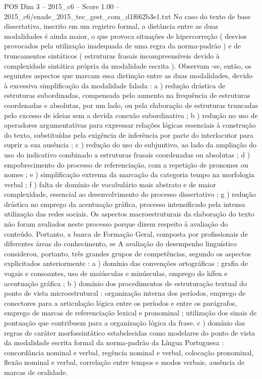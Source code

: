 \begin{textsample}{POS Dim 3 – 2015\_c6 – Score 1.00 – 2015\_c6/enade\_2015\_tec\_gest\_com\_d1f662b3e1.txt}
No caso do texto de base dissertativa, inscrito em um registro formal, a distância entre as duas modalidades é ainda maior, o que provoca situações de hipercorreção ( desvios provocados pela utilização inadequada de uma regra da norma-padrão ) e de truncamentos sintáticos ( estruturas frasais incompreensíveis devido à complexidade sintática própria da modalidade escrita ).
Observam -se, então, os seguintes aspectos que marcam essa distinção entre as duas modalidades, devido à excessiva simplificação da modalidade falada : a ) redução drástica de estruturas subordinadas, compensada pelo aumento na frequência de estruturas coordenadas e absolutas, por um lado, ou pela elaboração de estruturas truncadas pelo excesso de ideias sem a devida conexão subordinativa ; b ) redução no uso de operadores argumentativas para expressar relações lógicas essenciais à construção do texto, substituídas pela exigência de inferência por parte do interlocutor para suprir a sua ausência ; c ) redução do uso do subjuntivo, ao lado da ampliação do uso do indicativo combinado a estruturas frasais coordenadas ou absolutas ; d ) empobrecimento do processo de referenciação, com a repetição de pronomes ou nomes ; e ) simplificação extrema da marcação da categoria tempo na morfologia verbal ; f ) falta de domínio de vocabulário mais abstrato e de maior complexidade, essencial ao desenvolvimento do processo dissertativo ; g ) redução drástica no emprego da acentuação gráfica, processo intensificado pela intensa utilização das redes sociais.
Os aspectos macroestruturais da elaboração do texto não foram avaliados neste processo porque dizem respeito à avaliação do conteúdo.
Portanto, a banca de Formação Geral, composta por profissionais de diferentes áreas do conhecimento, se A avaliação do desempenho linguístico considerou, portanto, três grandes grupos de competências, segundo os aspectos explicitados anteriormente : a ) domínio das convenções ortográficas : grafia de vogais e consoantes, uso de maiúsculas e minúsculas, emprego do hífen e acentuação gráfica ; b ) domínio dos procedimentos de estruturação textual do ponto de vista microestrutural : organização interna dos períodos, emprego de conectores para a articulação lógica entre os períodos e entre os parágrafos, emprego de marcas de referenciação lexical e pronominal ; utilização dos sinais de pontuação que contribuem para a organização lógica da frase. c ) domínio das regras de caráter morfossintático estabelecidas como modelares do ponto de vista da modalidade escrita formal da norma-padrão da Língua Portuguesa : concordância nominal e verbal, regência nominal e verbal, colocação pronominal, flexão nominal e verbal, correlação entre tempos e modos verbais, ausência de marcas de oralidade.

\end{textsample}
